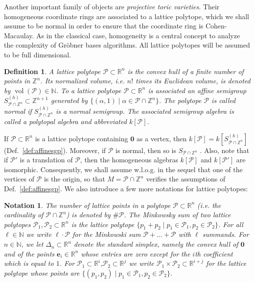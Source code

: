 \documentclass[12pt]{article}
\numberwithin{equation}{section}
\numberwithin{theorem}{section}
\newtheorem{definition}[theorem]{Definition}
\newtheorem{notation}[theorem]{Notation}
\newcommand{\Z}{\mathbb{Z}}
\DeclareMathOperator{\vol}{vol}
\newcommand{\sgp}{S}
\newcommand{\polytope}{\mathscr P}
\newcommand{\R}{\mathbb{R}}
\newcommand{\N}{\mathbb{N}}
\begin{document}
Another important family of objects are \emph{projective toric
  varieties}. Their homogeneous coordinate rings are associated to a
lattice polytope, which we shall assume to be normal in order to ensure that the coordinate ring is Cohen-Macaulay. As in the classical case, homogeneity is a
central concept to analyze the complexity of Gr\"obner bases
algorithms. All lattice polytopes will be assumed to be full dimensional.

\begin{definition}
A \emph{lattice polytope} $\polytope\subset\R^n$ is the convex hull of a
finite number of points in $\Z^n$. Its \emph{normalized volume}, \emph{i.e.} $n!$ times its Euclidean volume, is
denoted by $\vol(\polytope)\in\N$. 
To a lattice polytope $\polytope\subset\R^n$ is associated an affine
semigroup $S_{\polytope\cap\Z^n}^{(h)}\subset\Z^{n+1}$ generated by $\{(\alpha,1)\mid
\alpha\in\polytope\cap\Z^n\}$. The polytope $\polytope$ is called
\emph{normal} if $\sgp_{\polytope\cap\Z^n}^{(h)}$ is a normal semigroup. The
associated semigroup algebra is called a \emph{polytopal algebra} and
abbreviated $k[\polytope]$.
\end{definition}
If $\polytope\subset\R^n$ is a lattice polytope containing $\mathbf 0$ as a vertex, then $k[\polytope]=k[S_{\polytope\cap\Z^n}^{(h)}]$ (Def.~\ref{def:affinesgp}). Moreover, if $\polytope$ is normal, then so is $\sgp_{\polytope\cap \Z^n}$ \cite[Prop. 2.17]{CoxLitSch11}.
Also, note that if $\polytope'$ is a translation of $\polytope$, then the homogeneous algebras $k[\polytope]$ and $k[\polytope']$ are isomorphic. Consequently, we shall assume w.l.o.g. in the sequel that one of the vertices of $\polytope$ is the origin, so that $M=\polytope\cap\Z^n$ verifies the assumptions of Def.~\ref{def:affinesgp}. We also introduce a few more notations for lattice polytopes:

\begin{notation}
The number of lattice points in a polytope $\polytope\subset\R^n$
(\emph{i.e.} the cardinality of $\polytope\cap \Z^n$) is denoted by
$\#\polytope$.  The \emph{Minkowsky sum} of two lattice polytopes
$\polytope_1,\polytope_2\subset\R^n$ is the lattice polytope
$\{p_1+p_2 \mid p_1\in \polytope_1,p_2\in \polytope_2\}$. For all
$\ell\in \N$ we write $\ell\cdot\polytope$ for the Minkowski sum
$\polytope + \dots +\polytope$ with $\ell$ summands.  For $n\in\N$, we
let $\Delta_n\subset\R^n$ denote the \emph{standard simplex}, namely
the convex hull of $\mathbf 0$ and of the points $\mathbf e_i\in\R^n$
whose entries are zero except for the $i$th coefficient which is equal
to $1$.  For $\polytope_1\subset\R^i$,$\polytope_2\subset\R^j$ we write
$\polytope_1\times\polytope_2 \subset\R^{i+j}$ for the lattice polytope
whose points are $\{(p_1,p_2) \mid p_1\in\polytope_1,
p_2\in\polytope_2\}.$ 
\end{notation}
\end{document}
